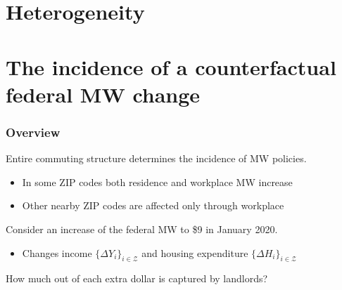 \documentclass[aspectratio=169, t]{beamer}
\newcommand{\Z}{\mathcal{Z}}
\begin{document}
\section{Heterogeneity}

\section{The incidence of a counterfactual federal MW change}

\begin{frame}
    \frametitle{Overview}
    
    Entire commuting structure determines the incidence of MW policies.
    \begin{itemize}
    	\vspace{1mm}
    	\item In some ZIP codes both residence and workplace MW increase
    	\vspace{1mm}
    	\item Other nearby ZIP codes are affected only through workplace
    \end{itemize}
    
    \pause
    \vspace{3mm}
    Consider an increase of the federal MW to \$9 in January 2020.
    \begin{itemize}
    	\vspace{1mm}
    	\item Changes income $\{\Delta Y_i\}_{i\in\Z}$ and housing expenditure $\{\Delta H_i\}_{i\in\Z}$
    \end{itemize}
    
    \pause
    \vspace{3mm}
    How much out of each extra dollar is captured by landlords?
   
\end{frame}
\end{document}
